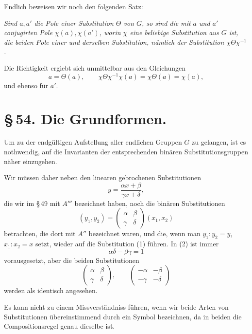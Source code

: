 \documentclass[11pt]{article}
\begin{document}
Endlich beweisen wir noch den folgenden Satz:

\emph{Sind $a,a'$ die Pole einer Substitution $\Theta$ von $G$, so sind die mit $a$ und $a'$ conjugirten Pole $\chi(a),\chi(a')$, worin $\chi$ eine beliebige Substitution aus $G$ ist, die beiden Pole einer und derselben Substitution, nämlich der Substitution $\chi\Theta\chi^{-1}$.}

Die Richtigkeit ergiebt sich unmittelbar aus den Gleichungen
\[
a=\Theta(a),\qquad \chi\Theta\chi^{-1}\chi(a)=\chi\Theta(a)=\chi(a),
\]
und ebenso für $a'$.

\section*{\S\,54. Die Grundformen.}

Um zu der endgültigen Aufstellung aller endlichen Gruppen $G$ zu gelangen, ist es nothwendig, auf die Invarianten der entsprechenden binären Substitutionsgruppen näher einzugehen.

Wir müssen daher neben den linearen gebrochenen Substitutionen
\begin{equation}
y=\frac{\alpha x+\beta}{\gamma x+\delta},
\tag{1}
\end{equation}
die wir im \S\,49 mit $A'''$ bezeichnet haben, noch die binären Substitutionen
\begin{equation}
(y_1,y_2)=\begin{pmatrix}\alpha&\beta\\\gamma&\delta\end{pmatrix}(x_1,x_2)
\tag{2}
\end{equation}
betrachten, die dort mit $A''$ bezeichnet waren, und die, wenn man $y_1:y_2=y$, $x_1:x_2=x$ setzt, wieder auf die Substitution (1) führen. In (2) ist immer
\begin{equation}
\alpha\delta-\beta\gamma=1
\tag{3}
\end{equation}
vorausgesetzt, aber die beiden Substitutionen
\[
\begin{pmatrix}\alpha&\beta\\\gamma&\delta\end{pmatrix},
\qquad
\begin{pmatrix}-\alpha&-\beta\\-\gamma&-\delta\end{pmatrix}
\]
werden als identisch angesehen.

Es kann nicht zu einem Missverständniss führen, wenn wir beide Arten von Substitutionen übereinstimmend durch ein Symbol bezeichnen, da in beiden die Compositionsregel genau dieselbe ist.
\end{document}
